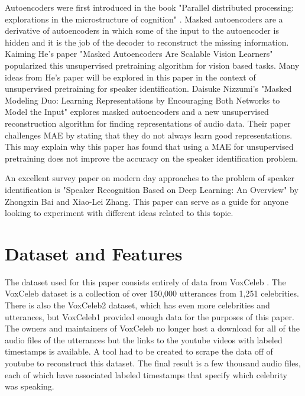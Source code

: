 \documentclass{article}
\begin{document}
Autoencoders were first introduced in the book "Parallel distributed processing: explorations in the microstructure of 
cognition" \cite{ParallelDistributedProcessing}. Masked autoencoders are a derivative of autoencoders in which some of the
input to the autoencoder is hidden and it is the job of the decoder to reconstruct the missing information. Kaiming He's paper
"Masked Autoencoders Are Scalable Vision Learners" \cite{MAE} popularized this unsupervised pretraining algorithm for vision based tasks.
Many ideas from He's paper will be explored in this paper in the context of unsupervised pretraining for speaker identification.
Daisuke Nizzumi's "Masked Modeling Duo: Learning Representations by Encouraging Both Networks to Model 
the Input" \cite{MaskedModelingDuo} explores masked autoencoders and a new unsupervised reconstruction algorithm for finding representations 
of audio data. Their paper challenges MAE by stating that they do not always learn good representations. This may explain 
why this paper has found that using a MAE for unsupervised pretraining does not improve the accuracy on the speaker identification problem.

An excellent survey paper on modern day approaches to the problem of speaker identification is "Speaker Recognition Based on
Deep Learning: An Overview" \cite{SpeakerRecognitionOverview} by Zhongxin Bai and Xiao-Lei Zhang. This paper can serve as
a guide for anyone looking to experiment with different ideas related to this topic.


\section{Dataset and Features}
The dataset used for this paper consists entirely of data from VoxCeleb \cite{DBLP:journals/corr/NagraniCZ17}. The 
VoxCeleb dataset is a collection of over 150,000 utterances from 1,251 celebrities. There is also the VoxCeleb2 \cite{Chung18b} 
dataset, which has even more celebrities and utterances, but VoxCeleb1 provided enough data for the purposes of this paper.
The owners and maintainers of VoxCeleb no longer host a download for all of the audio files of the utterances but the 
links to the youtube videos with labeled timestamps is available. A tool had to be created to scrape the data off of
youtube to reconstruct this dataset. The final result is a few thousand audio files, each of which have associated labeled
timestamps that specify which celebrity was speaking.
\end{document}
